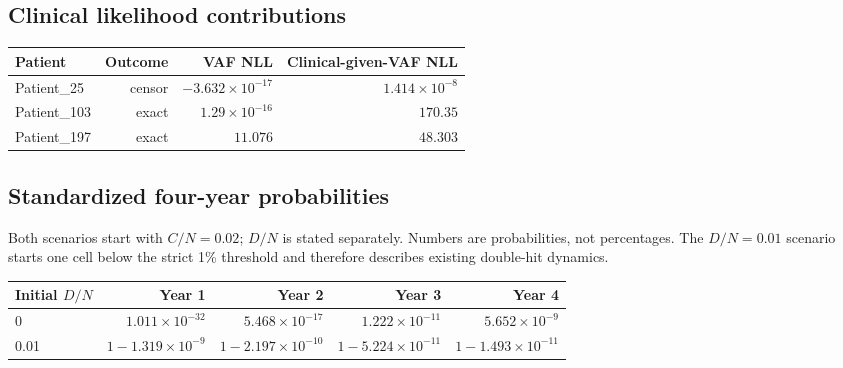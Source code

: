 \subsection{Clinical likelihood contributions}
\begin{center}\begin{tabular}{lrrr}\toprule
Patient & Outcome & VAF NLL & Clinical-given-VAF NLL\\\midrule
Patient\_25 & censor & $-3.632\times10^{-17}$ & $1.414\times10^{-8}$ \\
Patient\_103 & exact & $1.29\times10^{-16}$ & $170.35$ \\
Patient\_197 & exact & $11.076$ & $48.303$ \\
\bottomrule\end{tabular}\end{center}
\begin{samepage}\subsection{Standardized four-year probabilities}
Both scenarios start with $C/N=0.02$; $D/N$ is stated separately. Numbers are probabilities, not percentages. The $D/N=0.01$ scenario starts one cell below the strict 1\% threshold and therefore describes existing double-hit dynamics.
\begin{center}\begin{tabular}{lrrrr}\toprule
Initial $D/N$ & Year 1 & Year 2 & Year 3 & Year 4\\\midrule
0 & $1.011\times10^{-32}$ & $5.468\times10^{-17}$ & $1.222\times10^{-11}$ & $5.652\times10^{-9}$ \\
0.01 & $1-1.319\times10^{-9}$ & $1-2.197\times10^{-10}$ & $1-5.224\times10^{-11}$ & $1-1.493\times10^{-11}$ \\
\bottomrule\end{tabular}\end{center}\end{samepage}
